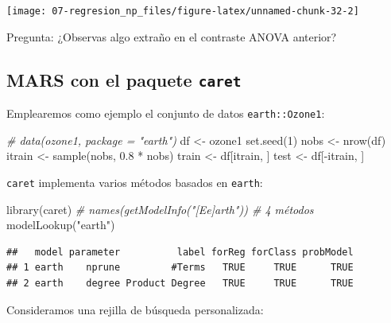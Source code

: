 \documentclass[
  spanish,
]{book}
\newenvironment{Shaded}{\begin{snugshade}}{\end{snugshade}}
\newcommand{\CommentTok}[1]{\textcolor[rgb]{0.56,0.35,0.01}{\textit{#1}}}
\newcommand{\DecValTok}[1]{\textcolor[rgb]{0.00,0.00,0.81}{#1}}
\newcommand{\FloatTok}[1]{\textcolor[rgb]{0.00,0.00,0.81}{#1}}
\newcommand{\FunctionTok}[1]{\textcolor[rgb]{0.00,0.00,0.00}{#1}}
\newcommand{\NormalTok}[1]{#1}
\newcommand{\OtherTok}[1]{\textcolor[rgb]{0.56,0.35,0.01}{#1}}
\newcommand{\SpecialCharTok}[1]{\textcolor[rgb]{0.00,0.00,0.00}{#1}}
\newcommand{\StringTok}[1]{\textcolor[rgb]{0.31,0.60,0.02}{#1}}
\theoremstyle{break}
\theoremstyle{definition}
\theoremstyle{definition}
\theoremstyle{definition}
\theoremstyle{definition}
\theoremstyle{remark}
\begin{document}
\begin{center}\texttt{[image: 07-regresion\_np\_files/figure-latex/unnamed-chunk-32-2]} \end{center}

Pregunta: ¿Observas algo extraño en el contraste ANOVA anterior?

\hypertarget{mars-con-el-paquete-caret}{%
\subsection{\texorpdfstring{MARS con el paquete \texttt{caret}}{MARS con el paquete caret}}\label{mars-con-el-paquete-caret}}

Emplearemos como ejemplo el conjunto de datos \texttt{earth::Ozone1}:

\begin{Shaded}
\begin{Highlighting}[]
\CommentTok{\# data(ozone1, package = "earth")}
\NormalTok{df }\OtherTok{\textless{}{-}}\NormalTok{ ozone1  }
\FunctionTok{set.seed}\NormalTok{(}\DecValTok{1}\NormalTok{)}
\NormalTok{nobs }\OtherTok{\textless{}{-}} \FunctionTok{nrow}\NormalTok{(df)}
\NormalTok{itrain }\OtherTok{\textless{}{-}} \FunctionTok{sample}\NormalTok{(nobs, }\FloatTok{0.8} \SpecialCharTok{*}\NormalTok{ nobs)}
\NormalTok{train }\OtherTok{\textless{}{-}}\NormalTok{ df[itrain, ]}
\NormalTok{test }\OtherTok{\textless{}{-}}\NormalTok{ df[}\SpecialCharTok{{-}}\NormalTok{itrain, ]}
\end{Highlighting}
\end{Shaded}

\texttt{caret} implementa varios métodos basados en \texttt{earth}:

\begin{Shaded}
\begin{Highlighting}[]
\FunctionTok{library}\NormalTok{(caret)}
\CommentTok{\# names(getModelInfo("[Ee]arth")) \# 4 métodos}
\FunctionTok{modelLookup}\NormalTok{(}\StringTok{"earth"}\NormalTok{)}
\end{Highlighting}
\end{Shaded}

\begin{verbatim}
##   model parameter          label forReg forClass probModel
## 1 earth    nprune         #Terms   TRUE     TRUE      TRUE
## 2 earth    degree Product Degree   TRUE     TRUE      TRUE
\end{verbatim}

Consideramos una rejilla de búsqueda personalizada:
\end{document}
